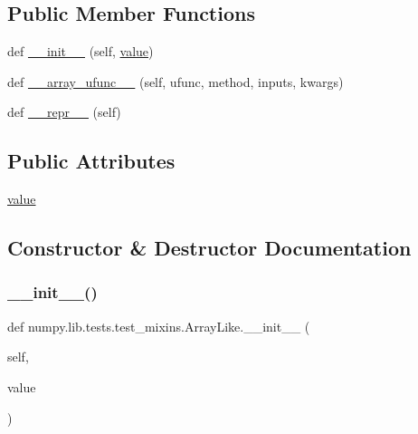 \subsection*{Public Member Functions}
\begin{DoxyCompactItemize}
\item 
def \hyperlink{classnumpy_1_1lib_1_1tests_1_1test__mixins_1_1ArrayLike_a1564d58e8477571f9c3aab7ae87cd3fe}{\+\_\+\+\_\+init\+\_\+\+\_\+} (self, \hyperlink{classnumpy_1_1lib_1_1tests_1_1test__mixins_1_1ArrayLike_ac5acddeb17e575b5e83300b00d5fdfd0}{value})
\item 
def \hyperlink{classnumpy_1_1lib_1_1tests_1_1test__mixins_1_1ArrayLike_a65d34c93d636ad7b3ea1b8000dfd1961}{\+\_\+\+\_\+array\+\_\+ufunc\+\_\+\+\_\+} (self, ufunc, method, inputs, kwargs)
\item 
def \hyperlink{classnumpy_1_1lib_1_1tests_1_1test__mixins_1_1ArrayLike_a074d3228f04885c681709e325245ed2b}{\+\_\+\+\_\+repr\+\_\+\+\_\+} (self)
\end{DoxyCompactItemize}
\subsection*{Public Attributes}
\begin{DoxyCompactItemize}
\item 
\hyperlink{classnumpy_1_1lib_1_1tests_1_1test__mixins_1_1ArrayLike_ac5acddeb17e575b5e83300b00d5fdfd0}{value}
\end{DoxyCompactItemize}


\subsection{Constructor \& Destructor Documentation}
\mbox{\label{classnumpy_1_1lib_1_1tests_1_1test__mixins_1_1ArrayLike_a1564d58e8477571f9c3aab7ae87cd3fe}} 
\subsubsection{\texorpdfstring{\+\_\+\+\_\+init\+\_\+\+\_\+()}{\_\_init\_\_()}}
{\footnotesize\ttfamily def numpy.\+lib.\+tests.\+test\+\_\+mixins.\+Array\+Like.\+\_\+\+\_\+init\+\_\+\+\_\+ (\begin{DoxyParamCaption}\item[{}]{self,  }\item[{}]{value }\end{DoxyParamCaption})}



